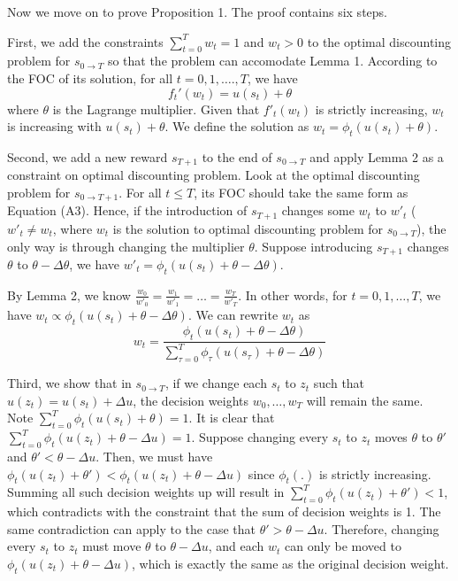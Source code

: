 \documentclass[
  12pt,
]{article}
\begin{document}
Now we move on to prove Proposition 1. The proof contains six steps.

First, we add the constraints \(\sum_{t=0}^T w_t=1\) and \(w_t>0\) to
the optimal discounting problem for \(s_{0\rightarrow T}\) so that the
problem can accomodate Lemma 1. According to the FOC of its solution,
for all \(t=0,1,….,T\), we have\[\tag{A3}
f_t'(w_t)=u(s_t)+\theta
\]where \(\theta\) is the Lagrange multiplier. Given that \(f'_t(w_t)\)
is strictly increasing, \(w_t\) is increasing with \(u(s_t)+\theta\). We
define the solution as \(w_t =\phi_t(u(s_t)+\theta)\).

Second, we add a new reward \(s_{T+1}\) to the end of
\(s_{0\rightarrow T}\) and apply Lemma 2 as a constraint on optimal
discounting problem. Look at the optimal discounting problem for
\(s_{0\rightarrow T+1}\). For all \(t\leq T\), its FOC should take the
same form as Equation (A3). Hence, if the introduction of \(s_{T+1}\)
changes some \(w_t\) to \(w'_t\) (\(w'_t \neq w_t\), where \(w_t\) is
the solution to optimal discounting problem for \(s_{0\rightarrow T}\)),
the only way is through changing the multiplier \(\theta\). Suppose
introducing \(s_{T+1}\) changes \(\theta\) to \(\theta-\Delta \theta\),
we have \(w'_t = \phi_t(u(s_t)+\theta-\Delta \theta)\).

By Lemma 2, we know
\(\frac{w_0}{w'_0}=\frac{w_1}{w'_1}=…=\frac{w_T}{w'_T}\). In other
words, for \(t=0,1,…,T\), we have
\(w_t \propto \phi_t(u(s_t)+\theta-\Delta \theta)\). We can rewrite
\(w_t\) as \[\tag{A4}
w_t = \frac{\phi_t(u(s_t)+\theta-\Delta \theta)}{\sum_{\tau=0}^{T}\phi_\tau(u(s_\tau)+\theta-\Delta \theta)}
\]

Third, we show that in \(s_{0\rightarrow T}\), if we change each \(s_t\)
to \(z_t\) such that \(u(z_t)=u(s_t)+\Delta u\), the decision weights
\(w_0,…,w_T\) will remain the same. Note
\(\sum_{t=0}^T \phi_t(u(s_t)+\theta)=1\). It is clear that
\(\sum_{t=0}^T \phi_t(u(z_t)+\theta-\Delta u)=1\). Suppose changing
every \(s_t\) to \(z_t\) moves \(\theta\) to \(\theta'\) and
\(\theta'<\theta-\Delta u\). Then, we must have
\(\phi_t(u(z_t)+\theta')<\phi_t(u(z_t)+\theta-\Delta u)\) since
\(\phi_t(.)\) is strictly increasing. Summing all such decision weights
up will result in \(\sum_{t=0}^T \phi_t(u(z_t)+\theta')<1\), which
contradicts with the constraint that the sum of decision weights is 1.
The same contradiction can apply to the case that
\(\theta'>\theta-\Delta u\). Therefore, changing every \(s_t\) to
\(z_t\) must move \(\theta\) to \(\theta - \Delta u\), and each \(w_t\)
can only be moved to \(\phi_t(u(z_t)+\theta -\Delta u)\), which is
exactly the same as the original decision weight.
\end{document}
